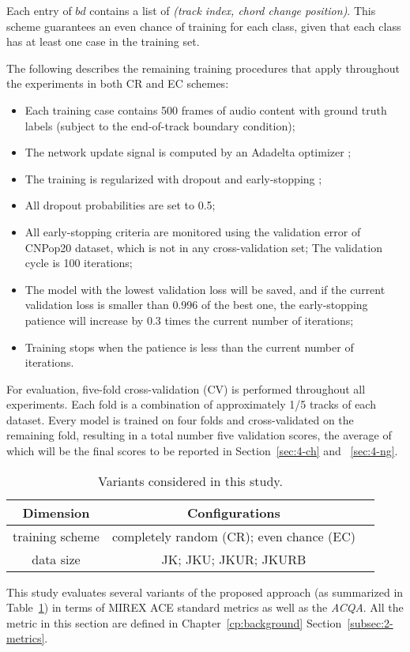 Each entry of $bd$ contains a list of \textit{(track index, chord change position)}. This scheme guarantees an even chance of training for each class, given that each class has at least one case in the training set.

The following describes the remaining training procedures that apply throughout the experiments in both CR and EC schemes:
\begin{itemize}
	\item Each training case contains 500 frames of audio content with ground truth labels (subject to the end-of-track boundary condition);
	\item The network update signal is computed by an Adadelta optimizer \cite{zeiler2012adadelta};
	\item The training is regularized with dropout \cite{srivastava2014dropout} and early-stopping \cite{prechelt1998early};
	\item All dropout probabilities are set to 0.5;
	\item All early-stopping criteria are monitored using the validation error of CNPop20 dataset, which is not in any cross-validation set; The validation cycle is 100 iterations;
	\item The model with the lowest validation loss will be saved, and if the current validation loss is smaller than 0.996 of the best one, the early-stopping patience will increase by 0.3 times the current number of iterations;
	\item Training stops when the patience is less than the current number of iterations.
\end{itemize}
For evaluation, five-fold cross-validation (CV) is performed throughout all experiments. Each fold is a combination of approximately 1/5 tracks of each dataset. Every model is trained on four folds and cross-validated on the remaining fold, resulting in a total number five validation scores, the average of which will be the final scores to be reported in Section~\ref{sec:4-ch} and ~\ref{sec:4-ng}.

\begin{table}[htb]
	\caption{Variants considered in this study.}
	\centering
	\footnotesize
	\begin{tabular}{|c|c|c|} \hline
		Dimension & Configurations \\ \hline
		training scheme & completely random (CR); even chance (EC) \\ \hline
		data size & JK; JKU; JKUR; JKURB \\ \hline
	\end{tabular}
	\label{tab:4-varexplore}
\end{table}
This study evaluates several variants of the proposed approach (as summarized in Table~\ref{tab:4-varexplore}) in terms of MIREX ACE standard metrics as well as the \textit{ACQA}. All the metric in this section are defined in Chapter~\ref{cp:background} Section~\ref{subsec:2-metrics}.

